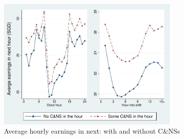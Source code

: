 \documentclass[reviewmode]{AEA}
\begin{document}
\begin{figure}
		\includegraphics[width=0.8\textwidth]{./fg/modelfree_earnings_vert.pdf}
		\caption{Average hourly earnings in next: with and without C\&NSs}
		\label{fg:earningsbyhour}
\end{figure}
\end{document}
